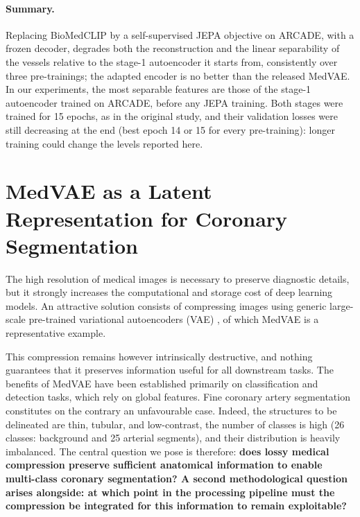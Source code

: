 \documentclass[conference]{IEEEtran}
\begin{document}
\paragraph{Summary.}
Replacing BioMedCLIP by a self-supervised JEPA objective on ARCADE, with a frozen decoder, degrades both the reconstruction and the linear separability of the vessels relative to the stage-1 autoencoder it starts from, consistently over three pre-trainings; the adapted encoder is no better than the released MedVAE. In our experiments, the most separable features are those of the stage-1 autoencoder trained on ARCADE, before any JEPA training. Both stages were trained for 15 epochs, as in the original study, and their validation losses were still decreasing at the end (best epoch 14 or 15 for every pre-training): longer training could change the levels reported here.

\newpage
\section{MedVAE as a Latent Representation for Coronary Segmentation}
\label{sec:segmentation}

The high resolution of medical images is necessary to preserve diagnostic details, but it strongly increases the computational and storage cost of deep learning models. An attractive solution consists of compressing images using generic large-scale pre-trained variational autoencoders (VAE) \cite{kingma2014vae}, of which MedVAE \cite{varma2025medvaeefficientautomatedinterpretation} is a representative example.

This compression remains however intrinsically destructive, and nothing guarantees that it preserves information useful for all downstream tasks. The benefits of MedVAE have been established primarily on classification and detection tasks, which rely on global features. Fine coronary artery segmentation constitutes on the contrary an unfavourable case. Indeed, the structures to be delineated are thin, tubular, and low-contrast, the number of classes is high (26 classes: background and 25 arterial segments), and their distribution is heavily imbalanced. The central question we pose is therefore: \textbf{does lossy medical compression preserve sufficient anatomical information to enable multi-class coronary segmentation? A second methodological question arises alongside: at which point in the processing pipeline must the compression be integrated for this information to remain exploitable?}
\end{document}
